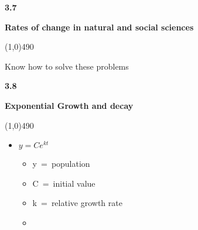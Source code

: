 \documentclass{report}
\begin{document}
    \bigbreak \noindent 
    \begin{Large}
        \begin{mdframed}
            \begin{center}
                \textbf{3.7}
            \end{center}
        \end{mdframed}
    \end{Large}
    \begin{Large}
        \begin{center}
            \textbf{Rates of change in natural and social sciences}
        \end{center}
    \end{Large}
    \line(1,0){490}

    \bigbreak \noindent 
    \begin{mdframed}
        \begin{itemize}
            Know how to solve these problems  
        \end{itemize}
    \end{mdframed}

    \bigbreak \noindent 
    \begin{Large}
        \begin{mdframed}
            \begin{center}
                \textbf{3.8}
            \end{center}
        \end{mdframed}
    \end{Large}
    \begin{Large}
        \begin{center}
            \textbf{Exponential Growth and decay}
        \end{center}
    \end{Large}
    \line(1,0){490}
    
   \bigbreak \noindent  
   \begin{mdframed}
       \begin{itemize}
           \item $y=Ce^{kt}$
                \begin{itemize}
                    \item y\ =\ population 
                    \item C\ =\ initial value
                    \item k\ =\ relative growth rate
                    \item
                \end{itemize}
       \end{itemize}

   \end{mdframed}
\end{document}
